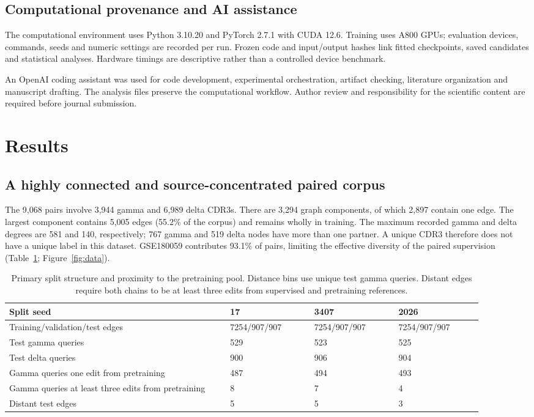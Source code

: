 \documentclass[10pt]{article}
\begin{document}
\subsection{Computational provenance and AI assistance}
The computational environment uses Python 3.10.20 and PyTorch 2.7.1 with CUDA
12.6. Training uses A800 GPUs; evaluation devices, commands, seeds and numeric
settings are recorded per run. Frozen code and input/output hashes link fitted
checkpoints, saved candidates and statistical analyses. Hardware timings are
descriptive rather than a controlled device benchmark.

An OpenAI coding assistant was used for code development, experimental
orchestration, artifact checking, literature organization and manuscript drafting.
The analysis files preserve the computational workflow. Author review and
responsibility for the scientific content are required before journal submission.

\section{Results}
\subsection{A highly connected and source-concentrated paired corpus}
The 9,068 pairs involve 3,944 gamma and 6,989 delta CDR3s. There are 3,294 graph
components, of which 2,897 contain one edge. The largest component contains
5,005 edges (55.2\% of the corpus) and remains wholly in training. The maximum
recorded gamma and delta degrees are 581 and 140, respectively; 767 gamma and
519 delta nodes have more than one partner. A unique CDR3 therefore does not
have a unique label in this dataset. GSE180059 contributes 93.1\% of pairs,
limiting the effective diversity of the paired supervision
(Table~\ref{tab:data}; Figure~\ref{fig:data}).

\begin{table}[ht]
\centering
\caption{Primary split structure and proximity to the pretraining pool. Distance bins use unique test gamma queries. Distant edges require both chains to be at least three edits from supervised and pretraining references.}
\label{tab:data}
\small
\setlength{\tabcolsep}{3pt}
\begin{tabular}{p{0.4200\linewidth}p{0.1600\linewidth}p{0.1600\linewidth}p{0.1600\linewidth}}
\toprule
Split seed & 17 & 3407 & 2026\\
\midrule
Training/validation/test edges & 7254/907/907 & 7254/907/907 & 7254/907/907\\
Test gamma queries & 529 & 523 & 525\\
Test delta queries & 900 & 906 & 904\\
Gamma queries one edit from pretraining & 487 & 494 & 493\\
Gamma queries at least three edits from pretraining & 8 & 7 & 4\\
Distant test edges & 5 & 5 & 3\\
\bottomrule
\end{tabular}
\end{table}
\end{document}
